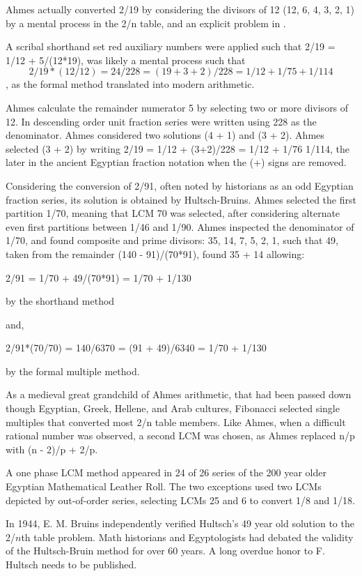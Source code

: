 \documentclass[12pt]{article}
\begin{document}
Ahmes actually converted 2/19 by considering the divisors of 12 (12, 6, 4, 3, 2, 1) by a mental process in the 2/n table, and an explicit problem in .
 
A scribal shorthand set red auxiliary numbers were applied such that 2/19 = 1/12 + 5/(12*19), was likely a mental process such that $$2/19*(12/12)= 24/228 = (19 + 3 + 2)/228 = 1/12 + 1/75 + 1/114$$, as the formal method translated into modern arithmetic.

Ahmes calculate the remainder numerator 5 by selecting two or more divisors of 12. In descending order unit fraction series were written using 228 as the denominator. Ahmes considered two solutions (4 + 1) and (3 + 2). Ahmes selected (3 + 2) by writing 2/19 = 1/12 + (3+2)/228 = 1/12 + 1/76 1/114, the later in the ancient Egyptian fraction notation when the (+) signs are removed. 

Considering the conversion of 2/91, often noted by historians as an odd Egyptian fraction series, its solution is obtained by Hultsch-Bruins. Ahmes selected the first partition 1/70, meaning that LCM 70 was selected, after considering alternate even first partitions between 1/46 and 1/90. Ahmes inspected the denominator of 1/70, and found composite and prime divisors: 35, 14, 7, 5, 2, 1, such that 49, taken from the remainder (140 - 91)/(70*91), found 35 + 14 allowing:

2/91 = 1/70 + 49/(70*91) = 1/70 + 1/130

by the shorthand method

and,

2/91*(70/70) = 140/6370 = (91 + 49)/6340 = 1/70 + 1/130 

by the formal multiple method.

As a medieval great grandchild of Ahmes arithmetic, that had been passed down though Egyptian, Greek, Hellene, and Arab cultures, Fibonacci selected single multiples that converted most 2/n table members. Like Ahmes, when a difficult rational number was observed, a second LCM was chosen, as Ahmes replaced n/p with (n - 2)/p + 2/p.  

A one phase LCM method appeared in 24 of 26 series of the 200 year older Egyptian Mathematical Leather Roll. The two exceptions used two LCMs depicted by out-of-order series, selecting LCMs 25 and 6 to convert 1/8 and 1/18. 

In 1944, E. M. Bruins independently verified Hultsch's 49 year old solution to the 2/$n$th table problem.  Math historians and Egyptologists had debated the validity of the Hultsch-Bruin method for over 60 years. A long overdue honor to F. Hultsch needs to be published.
\end{document}
